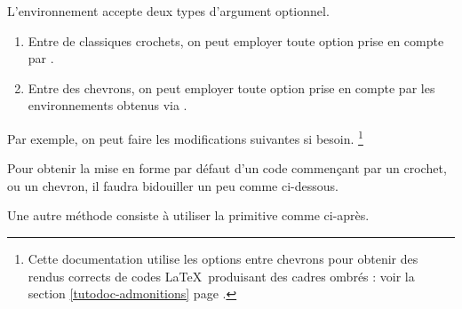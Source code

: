 \documentclass{../main/main}
\begin{document}
\begin{tdocexa}[Personnaliser]
	L'environnement  accepte deux types d'argument optionnel.
	\begin{enumerate}
		\item Entre de classiques crochets, on peut employer toute option prise en compte par .

        \item Entre des chevrons, on peut employer toute option prise en compte par les environnements obtenus via .
	\end{enumerate}

	Par exemple, on peut faire les modifications suivantes si besoin.%
	\footnote{
		Cette documentation utilise les options entre chevrons pour obtenir des rendus corrects de codes \LaTeX\ produisant des cadres ombrés : voir la section \ref{tutodoc-admonitions} page \pageref{tutodoc-admonitions}.
	}

\end{tdocexa}

\medskip

\begin{tdocwarn}
    Pour obtenir la mise en forme par défaut d'un code commençant par un crochet, ou un chevron, il faudra bidouiller un peu comme ci-dessous.

    \smallskip

    Une autre méthode consiste à utiliser la primitive  comme ci-après.
\end{tdocwarn}
\end{document}
